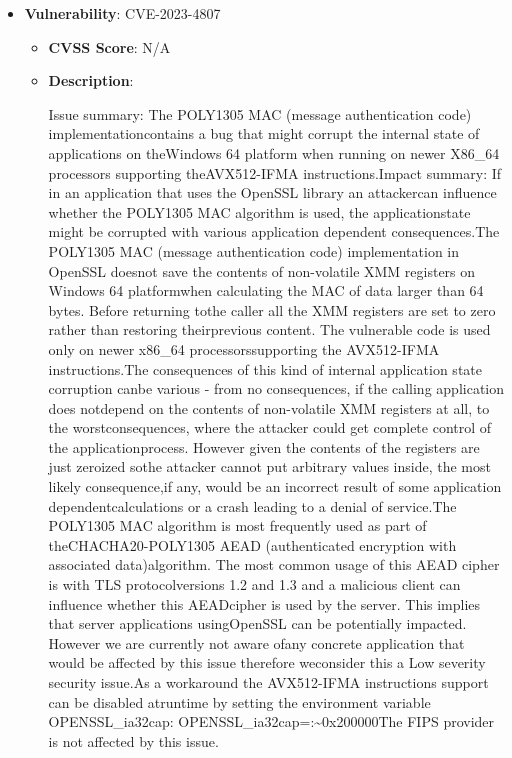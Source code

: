 \documentclass{article}
\begin{document}
\begin{itemize}
        \item \textbf{Vulnerability}: CVE-2023-4807
        \begin{itemize}
            \item \textbf{CVSS Score}:  N/A 
            \item \textbf{Description}:
            \parbox[t]{0.9\linewidth}{
                \ttfamily Issue summary: The POLY1305 MAC (message authentication code) implementationcontains a bug that might corrupt the internal state of applications on theWindows 64 platform when running on newer X86\_64 processors supporting theAVX512-IFMA instructions.Impact summary: If in an application that uses the OpenSSL library an attackercan influence whether the POLY1305 MAC algorithm is used, the applicationstate might be corrupted with various application dependent consequences.The POLY1305 MAC (message authentication code) implementation in OpenSSL doesnot save the contents of non-volatile XMM registers on Windows 64 platformwhen calculating the MAC of data larger than 64 bytes. Before returning tothe caller all the XMM registers are set to zero rather than restoring theirprevious content. The vulnerable code is used only on newer x86\_64 processorssupporting the AVX512-IFMA instructions.The consequences of this kind of internal application state corruption canbe various - from no consequences, if the calling application does notdepend on the contents of non-volatile XMM registers at all, to the worstconsequences, where the attacker could get complete control of the applicationprocess. However given the contents of the registers are just zeroized sothe attacker cannot put arbitrary values inside, the most likely consequence,if any, would be an incorrect result of some application dependentcalculations or a crash leading to a denial of service.The POLY1305 MAC algorithm is most frequently used as part of theCHACHA20-POLY1305 AEAD (authenticated encryption with associated data)algorithm. The most common usage of this AEAD cipher is with TLS protocolversions 1.2 and 1.3 and a malicious client can influence whether this AEADcipher is used by the server. This implies that server applications usingOpenSSL can be potentially impacted. However we are currently not aware ofany concrete application that would be affected by this issue therefore weconsider this a Low severity security issue.As a workaround the AVX512-IFMA instructions support can be disabled atruntime by setting the environment variable OPENSSL\_ia32cap:   OPENSSL\_ia32cap=:\~{}0x200000The FIPS provider is not affected by this issue.
            }
        \end{itemize}
    

\end{itemize}
\end{document}

